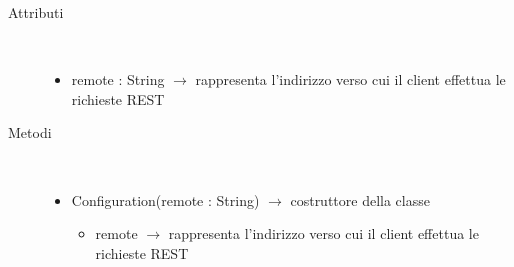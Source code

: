 \begin{description}
\item[Attributi] \hfill \\
\vspace{-7mm}
\begin{itemize}
	\item remote : String $\rightarrow$ rappresenta l'indirizzo verso cui il client effettua le richieste REST
\end{itemize}

\item[Metodi] \hfill \\
\vspace{-7mm}
\begin{itemize}
	\item Configuration(remote : String) $\rightarrow$ costruttore della classe\begin{itemize}
		\item remote $\rightarrow$ rappresenta l'indirizzo verso cui il client effettua le richieste REST
	\end{itemize}
	
\end{itemize}

\end{description}